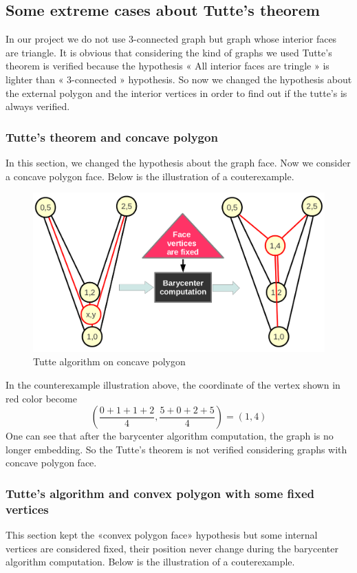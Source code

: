 \subsection{Some extreme cases about Tutte's theorem}
In our project we do not use 3-connected graph but graph whose interior faces are triangle. It is obvious that considering the kind of graphs we used Tutte's theorem is verified because the hypothesis « All interior faces are tringle » is lighter than « 3-connected » hypothesis. So now we changed the hypothesis about the external polygon and the interior vertices in order to find out if the tutte's  is always verified.  

\subsubsection{Tutte's theorem and concave polygon}

In this section, we changed the hypothesis about the graph face. Now we consider a concave polygon face. Below is the illustration of a couterexample. 

\begin {figure}[H]
  \centering
  \includegraphics[scale=0.3]{img/tutte2.png}
  \caption{Tutte algorithm on concave polygon}
  \label{tutte2}
\end {figure}
\noindent
In the counterexample illustration above, the coordinate of the vertex shown in red color become $$(\frac{0+1+1+2}{4} , \frac{5+0+2+5}{4}) = (1 , 4)$$
One can see that after the barycenter algorithm computation, the graph is no longer embedding. So the Tutte's theorem is not verified considering graphs with concave polygon face. 

\subsubsection{Tutte's algorithm and convex polygon with some fixed vertices}
This section kept the «convex polygon face» hypothesis but some internal vertices are considered fixed, their position never change during the barycenter algorithm computation. Below is the illustration of a couterexample. 

